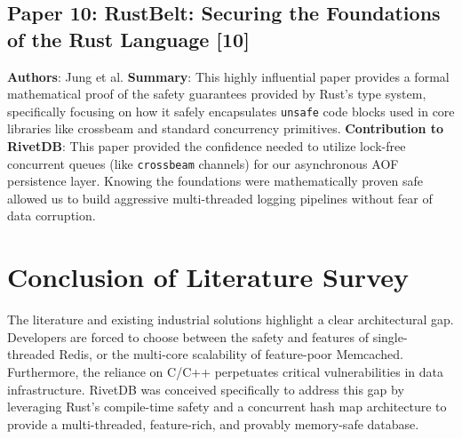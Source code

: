 \subsection{Paper 10: RustBelt: Securing the Foundations of the Rust Language [10]}
\textbf{Authors}: Jung et al.
\textbf{Summary}: This highly influential paper provides a formal mathematical proof of the safety guarantees provided by Rust's type system, specifically focusing on how it safely encapsulates \texttt{unsafe} code blocks used in core libraries like crossbeam and standard concurrency primitives.
\textbf{Contribution to RivetDB}: This paper provided the confidence needed to utilize lock-free concurrent queues (like \texttt{crossbeam} channels) for our asynchronous AOF persistence layer. Knowing the foundations were mathematically proven safe allowed us to build aggressive multi-threaded logging pipelines without fear of data corruption.

\section{Conclusion of Literature Survey}
The literature and existing industrial solutions highlight a clear architectural gap. Developers are forced to choose between the safety and features of single-threaded Redis, or the multi-core scalability of feature-poor Memcached. Furthermore, the reliance on C/C++ perpetuates critical vulnerabilities in data infrastructure. RivetDB was conceived specifically to address this gap by leveraging Rust's compile-time safety and a concurrent hash map architecture to provide a multi-threaded, feature-rich, and provably memory-safe database.
